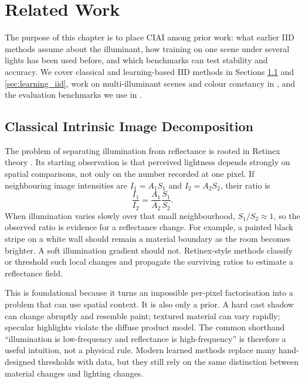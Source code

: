\chapter{Related Work}
\label{ch:related}

The purpose of this chapter is to place CIAI among prior work: what earlier IID methods
assume about the illuminant, how training on one scene under several lights has been used
before, and which benchmarks can test stability and accuracy.
We cover classical and learning-based IID methods in Sections \ref{sec:classical_iid}
and \ref{sec:learning_iid}, work on multi-illuminant scenes and colour constancy in
, and the evaluation benchmarks we use in .


\section{Classical Intrinsic Image Decomposition}
\label{sec:classical_iid}

The problem of separating illumination from reflectance is rooted in Retinex
theory . Its starting observation is that perceived
lightness depends strongly on spatial comparisons, not only on the number
recorded at one pixel. If neighbouring image intensities are $I_1=A_1S_1$ and
$I_2=A_2S_2$, their ratio is
\begin{equation}
  \frac{I_1}{I_2}=\frac{A_1}{A_2}\frac{S_1}{S_2}.
  \label{eq:retinex_ratio}
\end{equation}
When illumination varies slowly over that small neighbourhood,
$S_1/S_2\approx1$, so the observed ratio is evidence for a reflectance change.
For example, a painted black stripe on a white wall should remain a material
boundary as the room becomes brighter. A soft illumination gradient should not.
Retinex-style methods classify or threshold such local changes and propagate the
surviving ratios to estimate a reflectance field.

This is foundational because it turns an impossible per-pixel factorisation into
a problem that can use spatial context. It is also only a prior. A hard cast
shadow can change abruptly and resemble paint; textured material can vary rapidly;
specular highlights violate the diffuse product model. The common shorthand
``illumination is low-frequency and reflectance is high-frequency'' is therefore
a useful intuition, not a physical rule. Modern learned methods replace many
hand-designed thresholds with data, but they still rely on the same distinction
between material changes and lighting changes.

